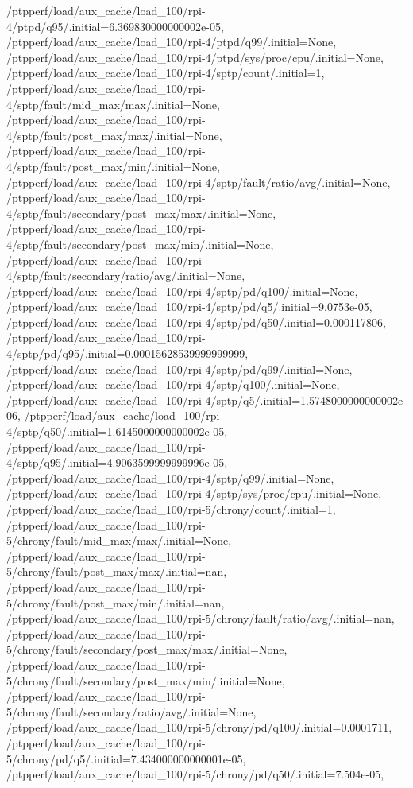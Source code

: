 {    /ptpperf/load/aux_cache/load_100/rpi-4/ptpd/q95/.initial=6.369830000000002e-05,
    /ptpperf/load/aux_cache/load_100/rpi-4/ptpd/q99/.initial=None,
    /ptpperf/load/aux_cache/load_100/rpi-4/ptpd/sys/proc/cpu/.initial=None,
    /ptpperf/load/aux_cache/load_100/rpi-4/sptp/count/.initial=1,
    /ptpperf/load/aux_cache/load_100/rpi-4/sptp/fault/mid_max/max/.initial=None,
    /ptpperf/load/aux_cache/load_100/rpi-4/sptp/fault/post_max/max/.initial=None,
    /ptpperf/load/aux_cache/load_100/rpi-4/sptp/fault/post_max/min/.initial=None,
    /ptpperf/load/aux_cache/load_100/rpi-4/sptp/fault/ratio/avg/.initial=None,
    /ptpperf/load/aux_cache/load_100/rpi-4/sptp/fault/secondary/post_max/max/.initial=None,
    /ptpperf/load/aux_cache/load_100/rpi-4/sptp/fault/secondary/post_max/min/.initial=None,
    /ptpperf/load/aux_cache/load_100/rpi-4/sptp/fault/secondary/ratio/avg/.initial=None,
    /ptpperf/load/aux_cache/load_100/rpi-4/sptp/pd/q100/.initial=None,
    /ptpperf/load/aux_cache/load_100/rpi-4/sptp/pd/q5/.initial=9.0753e-05,
    /ptpperf/load/aux_cache/load_100/rpi-4/sptp/pd/q50/.initial=0.000117806,
    /ptpperf/load/aux_cache/load_100/rpi-4/sptp/pd/q95/.initial=0.00015628539999999999,
    /ptpperf/load/aux_cache/load_100/rpi-4/sptp/pd/q99/.initial=None,
    /ptpperf/load/aux_cache/load_100/rpi-4/sptp/q100/.initial=None,
    /ptpperf/load/aux_cache/load_100/rpi-4/sptp/q5/.initial=1.5748000000000002e-06,
    /ptpperf/load/aux_cache/load_100/rpi-4/sptp/q50/.initial=1.6145000000000002e-05,
    /ptpperf/load/aux_cache/load_100/rpi-4/sptp/q95/.initial=4.9063599999999996e-05,
    /ptpperf/load/aux_cache/load_100/rpi-4/sptp/q99/.initial=None,
    /ptpperf/load/aux_cache/load_100/rpi-4/sptp/sys/proc/cpu/.initial=None,
    /ptpperf/load/aux_cache/load_100/rpi-5/chrony/count/.initial=1,
    /ptpperf/load/aux_cache/load_100/rpi-5/chrony/fault/mid_max/max/.initial=None,
    /ptpperf/load/aux_cache/load_100/rpi-5/chrony/fault/post_max/max/.initial=nan,
    /ptpperf/load/aux_cache/load_100/rpi-5/chrony/fault/post_max/min/.initial=nan,
    /ptpperf/load/aux_cache/load_100/rpi-5/chrony/fault/ratio/avg/.initial=nan,
    /ptpperf/load/aux_cache/load_100/rpi-5/chrony/fault/secondary/post_max/max/.initial=None,
    /ptpperf/load/aux_cache/load_100/rpi-5/chrony/fault/secondary/post_max/min/.initial=None,
    /ptpperf/load/aux_cache/load_100/rpi-5/chrony/fault/secondary/ratio/avg/.initial=None,
    /ptpperf/load/aux_cache/load_100/rpi-5/chrony/pd/q100/.initial=0.0001711,
    /ptpperf/load/aux_cache/load_100/rpi-5/chrony/pd/q5/.initial=7.434000000000001e-05,
    /ptpperf/load/aux_cache/load_100/rpi-5/chrony/pd/q50/.initial=7.504e-05,
}
